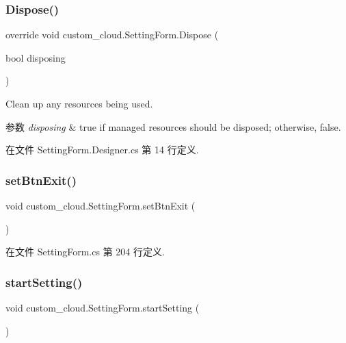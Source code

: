 \subsubsection{\texorpdfstring{Dispose()}{Dispose()}}
{\footnotesize\ttfamily override void custom\+\_\+cloud.\+Setting\+Form.\+Dispose (\begin{DoxyParamCaption}\item[{bool}]{disposing }\end{DoxyParamCaption})\hspace{0.3cm}{\ttfamily [protected]}}



Clean up any resources being used. 


\begin{DoxyParams}{参数}
{\em disposing} & true if managed resources should be disposed; otherwise, false.\\
\hline
\end{DoxyParams}


在文件 Setting\+Form.\+Designer.\+cs 第 14 行定义.

\mbox{\label{classcustom__cloud_1_1_setting_form_affe03f43484db3620e97bedf3fa7bcbe}} 
\subsubsection{\texorpdfstring{set\+Btn\+Exit()}{setBtnExit()}}
{\footnotesize\ttfamily void custom\+\_\+cloud.\+Setting\+Form.\+set\+Btn\+Exit (\begin{DoxyParamCaption}{ }\end{DoxyParamCaption})}



在文件 Setting\+Form.\+cs 第 204 行定义.

\mbox{\label{classcustom__cloud_1_1_setting_form_a3982341175c5ae953d4686f876a7b1f4}} 
\subsubsection{\texorpdfstring{start\+Setting()}{startSetting()}}
{\footnotesize\ttfamily void custom\+\_\+cloud.\+Setting\+Form.\+start\+Setting (\begin{DoxyParamCaption}{ }\end{DoxyParamCaption})}



